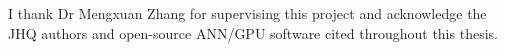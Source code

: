 I thank Dr Mengxuan Zhang for supervising this project and acknowledge the
JHQ authors and open-source ANN/GPU software cited throughout this thesis.


